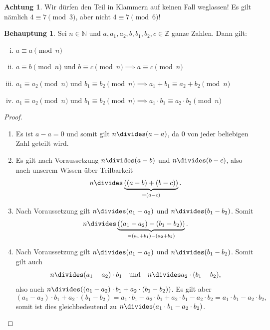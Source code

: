 \documentclass[a4paper,ngerman,12pt]{scrartcl}
\newcommand{\N}{\mathbb{N}}
\newcommand{\Z}{\mathbb{Z}}
\theoremstyle{definition}
\newtheorem{satz}{Behauptung}
\newtheorem*{acht}{Achtung}
\newenvironment{satzliste}{\begin{enumerate}[(i)]}{\end{enumerate}}
\newenvironment{beweisliste}{\begin{enumerate}[Zu (i):]}{\end{enumerate}}
\begin{document}
\begin{acht}
  Wir dürfen den Teil in Klammern auf keinen Fall weglassen! Es gilt nämlich
  $4 \equiv 7 \pmod{3}$, aber nicht $4 \equiv 7 \pmod{6}$!
\end{acht}

\begin{satz}
  Sei $n \in \N$ und $a, a_1, a_2, b, b_1, b_2, c \in \Z$ ganze Zahlen. Dann gilt:
  \begin{satzliste}
    \item $a \equiv a \pmod{n}$
    \item $a \equiv b \pmod{n} \text{ und } b \equiv c \pmod{n} \implies a \equiv c \pmod{n}$
    \item $a_1 \equiv a_2 \pmod{n} \text{ und } b_1 \equiv b_2 \pmod{n} \implies a_1 + b_1 \equiv a_2 + b_2 \pmod{n}$
    \item $a_1 \equiv a_2 \pmod{n} \text{ und } b_1 \equiv b_2 \pmod{n} \implies a_1 \cdot b_1 \equiv a_2 \cdot b_2 \pmod{n}$
  \end{satzliste}
\end{satz}

\begin{proof}
  \begin{beweisliste}
    \item Es ist $a - a = 0$ und somit gilt $n \divides (a - a)$, da $0$ von jeder beliebigen Zahl geteilt wird.
    \item Es gilt nach Voraussetzung $n \divides (a-b)$ und $n \divides (b-c)$, also nach unserem Wissen über Teilbarkeit
    \[ n \divides \underbrace{\left((a-b) + (b-c)\right)}_{= (a - c)}. \]
    \item Nach Voraussetzung gilt $n \divides (a_1 - a_2)$ und $n \divides (b_1 - b_2)$. Somit
    \[ n \divides \underbrace{\left((a_1 - a_2) - (b_1 - b_2)\right)}_{= (a_1 + b_1) - (a_2 + b_2)}. \]
    \item Nach Voraussetzung gilt $n \divides (a_1 - a_2)$ und $n \divides (b_1 - b_2)$. Somit gilt auch
    \[ n \divides (a_1 - a_2) \cdot b_1 \quad \text{und} \quad n \divides a_2 \cdot (b_1 - b_2), \]
    also auch $n \divides ((a_1 - a_2) \cdot b_1 + a_2 \cdot (b_1 - b_2))$. Es gilt aber
    \[ (a_1 - a_2) \cdot b_1 + a_2 \cdot (b_1 - b_2) = a_1 \cdot b_1 - a_2 \cdot b_1 + a_2 \cdot b_1 - a_2 \cdot b_2 = a_1 \cdot b_1 - a_2 \cdot b_2, \]
    somit ist dies gleichbedeutend zu $n \divides (a_1 \cdot b_1 - a_2 \cdot b_2)$.\qedhere
  \end{beweisliste}
\end{proof}
\end{document}
